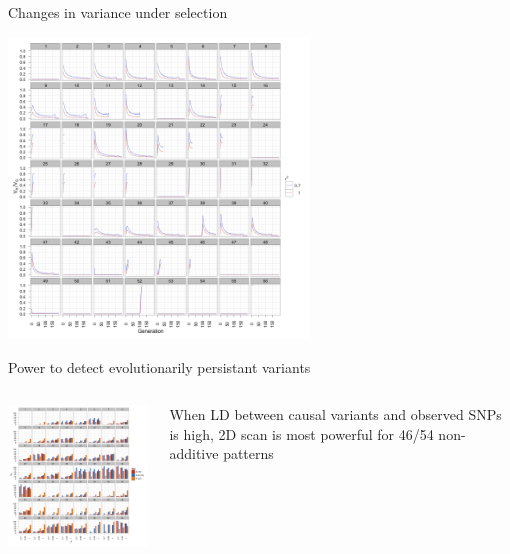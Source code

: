 \documentclass{beamer}
\begin{document}
\begin{frame}{Changes in variance under selection}
\begin{center}
\includegraphics[width=8cm]{sup_propadditive_det.png}
\end{center}
\end{frame}

\begin{frame}{Power to detect evolutionarily persistant variants}

\begin{columns}[c]


\includegraphics[width=8cm]{sup_heritbars_sim.png}


When LD between causal variants and observed SNPs is high, 2D scan is most powerful for 46/54 non-additive patterns

\end{columns}
\end{frame}
\end{document}
